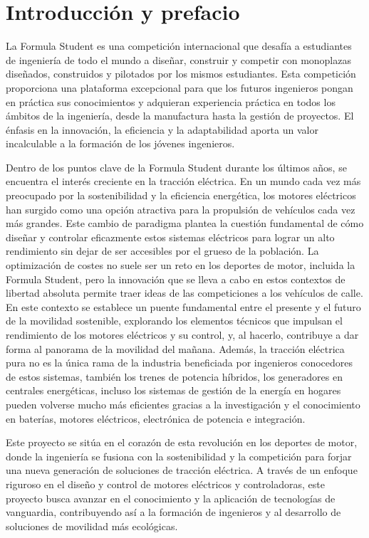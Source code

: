 \chapter{Introducción y prefacio}

La Formula Student es una competición internacional que desafía a estudiantes de ingeniería de todo el mundo a diseñar, construir y competir con monoplazas diseñados, construidos y pilotados por los mismos estudiantes. Esta competición proporciona una plataforma excepcional para que los futuros ingenieros pongan en práctica sus conocimientos y adquieran experiencia práctica en todos los ámbitos de la ingeniería, desde la manufactura hasta la gestión de proyectos. El énfasis en la innovación, la eficiencia y la adaptabilidad aporta un valor incalculable a la formación de los jóvenes ingenieros.

Dentro de los puntos clave de la Formula Student durante los últimos años, se encuentra el interés creciente en la tracción eléctrica. En un mundo cada vez más preocupado por la sostenibilidad y la eficiencia energética, los motores eléctricos han surgido como una opción atractiva para la propulsión de vehículos cada vez más grandes. Este cambio de paradigma plantea la cuestión fundamental de cómo diseñar y controlar eficazmente estos sistemas eléctricos para lograr un alto rendimiento sin dejar de ser accesibles por el grueso de la población. La optimización de costes no suele ser un reto en los deportes de motor, incluida la Formula Student, pero la innovación que se lleva a cabo en estos contextos de libertad absoluta permite traer ideas de las competiciones a los vehículos de calle. En este contexto se establece un puente fundamental entre el presente y el futuro de la movilidad sostenible, explorando los elementos técnicos que impulsan el rendimiento de los motores eléctricos y su control, y, al hacerlo, contribuye a dar forma al panorama de la movilidad del mañana. Además, la tracción eléctrica pura no es la única rama de la industria beneficiada por ingenieros conocedores de estos sistemas, también los trenes de potencia híbridos, los generadores en centrales energéticas, incluso los sistemas de gestión de la energía en hogares pueden volverse mucho más eficientes gracias a la investigación y el conocimiento en baterías, motores eléctricos, electrónica de potencia e integración.

Este proyecto se sitúa en el corazón de esta revolución en los deportes de motor, donde la ingeniería se fusiona con la sostenibilidad y la competición para forjar una nueva generación de soluciones de tracción eléctrica. A través de un enfoque riguroso en el diseño y control de motores eléctricos y controladoras, este proyecto busca avanzar en el conocimiento y la aplicación de tecnologías de vanguardia, contribuyendo así a la formación de ingenieros y al desarrollo de soluciones de movilidad más ecológicas.

